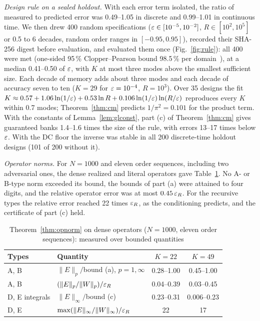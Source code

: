 \emph{Design rule on a sealed holdout.} With each error term isolated, the ratio of measured to predicted error was 0.49--1.05 in discrete and 0.99--1.01 in continuous time. We then drew 400 random specifications ($\varepsilon\in[10^{-5},10^{-2}]$, $R\in[10^2,10^5]$ or 0.5 to 6 decades, random order ranges in $[-0.95,0.95]$), recorded their SHA-256 digest before evaluation, and evaluated them once\ifsp\else{} (Fig.~\ref{fig:rule})\fi: all 400 were met (one-sided 95\,\% Clopper--Pearson bound 98.5\,\% per domain~\cite{clopper1934}), at a median 0.41--0.50 of $\varepsilon$, with $K$ at most three modes above the smallest sufficient size. Each decade of memory adds about three modes and each decade of accuracy seven to ten ($K=29$ for $\varepsilon=10^{-4}$, $R=10^3$). Over 35 designs the fit $K\approx0.57+1.06\ln(1/\varepsilon)+0.53\ln R+0.106\ln(1/\varepsilon)\ln(R/\varepsilon)$ reproduces every $K$ within 0.7 modes; Theorem~\ref{thm:cm} predicts $1/\pi^2=0.101$ for the product term. With the constants of Lemma~\ref{lem:glconst}, part (c) of Theorem~\ref{thm:cm} gives guaranteed banks 1.4--1.6 times the size of the rule, with errors 13--17 times below $\varepsilon$. With the DC floor the inverse was stable in all 200 discrete-time holdout designs (101 of 200 without it).

\ifsp\else\fi
\emph{Operator norms.} For $N=1000$ and eleven order sequences, including two adversarial ones, the dense realized and literal operators gave Table~\ref{tab:opnorm}. No A- or B-type norm exceeded its bound, the bounds of part (a) were attained to four digits, and the relative operator error was at most $0.45\,\varepsilon_R$. For the recursive types the relative error reached 22 times $\varepsilon_R$, as the conditioning predicts, and the certificate of part (c) held.

\begin{table}[t]
\caption{Theorem~\ref{thm:opnorm} on dense operators ($N=1000$, eleven order sequences): measured over bounded quantities}\label{tab:opnorm}
\centering\footnotesize\setlength{\tabcolsep}{3pt}
\begin{tabular}{@{}llcc@{}}
\toprule
Types & Quantity & $K=22$ & $K=49$\\
\midrule
A, B & $\|E\|_p/$bound (a), $p=1,\infty$ & 0.28--1.00 & 0.45--1.00\\
A, B & $(\|E\|_p/\|W\|_p)/\varepsilon_R$ & 0.04--0.39 & 0.03--0.45\\
D, E integrals & $\|E\|_\infty/$bound (c) & 0.23--0.31 & 0.006--0.23\\
D, E & $\max(\|E\|_\infty/\|W\|_\infty)/\varepsilon_R$ & 22 & 17\\
\bottomrule
\end{tabular}
\end{table}

